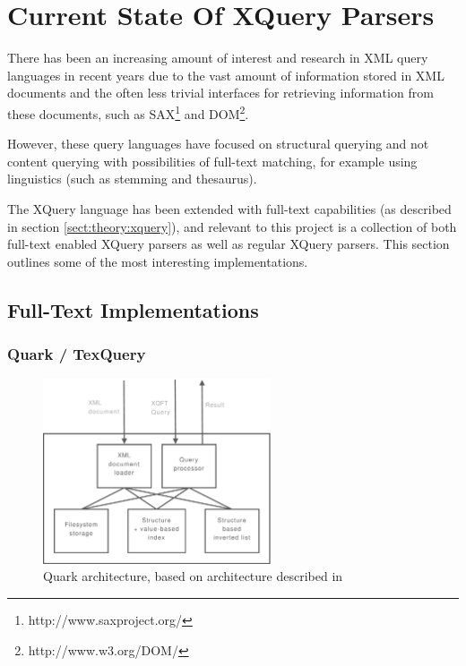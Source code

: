 \section{Current State Of XQuery Parsers}
\label{sect:theory:stateoftheart}
There has been an increasing amount of interest and research in XML query
languages in recent years due to the vast amount of information stored in XML
documents and the often less trivial interfaces for retrieving information
from these documents, such as SAX\footnote{http://www.saxproject.org/} and DOM\footnote{http://www.w3.org/DOM/}.

However, these query languages have focused on structural querying and not
content querying with possibilities of full-text matching, for example using
linguistics (such as stemming and thesaurus).

The XQuery language has been extended with full-text capabilities (as described
in section \ref{sect:theory:xquery}), and relevant to this project is a
collection of both full-text enabled XQuery parsers as well as regular XQuery
parsers. This section outlines some of the most interesting implementations.

\subsection{Full-Text Implementations}
\subsubsection{Quark / TexQuery}
\begin{figure}[!h]
  \centering
    \includegraphics[width=0.6\textwidth]{diagrams/quark_arch}
  \caption[Quark architecture]{Quark architecture, based on architecture described in
  \cite{quark_efficientxquery}}
\end{figure}


